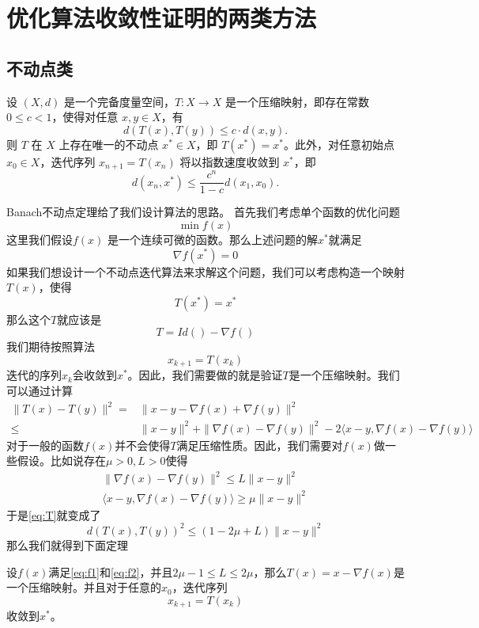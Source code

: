 \section{优化算法收敛性证明的两类方法}
\subsection{不动点类}
\begin{theorem}[Banach不动点定理] 设 $(X, d)$ 是一个完备度量空间，$T: X \to X$ 是一个压缩映射，即存在常数 $0 \leq c < 1$，使得对任意 $x, y \in X$，有
    \[
    d(T(x), T(y)) \leq c \cdot d(x, y).
    \]
    则 $T$ 在 $X$ 上存在唯一的不动点 $x^* \in X$，即 $T(x^*) = x^*$。此外，对任意初始点 $x_0 \in X$，迭代序列 $x_{n+1} = T(x_n)$ 将以指数速度收敛到 $x^*$，即
    \[
    d(x_n, x^*) \leq \frac{c^n}{1-c} d(x_1, x_0).
    \]
\end{theorem}
Banach不动点定理给了我们设计算法的思路。 首先我们考虑单个函数的优化问题
\begin{equation}\label{eq:opt_problem}
\min f(x)
\end{equation}
这里我们假设$f(x)$ 是一个连续可微的函数。那么上述问题的解$x^*$就满足
\[
\nabla f(x^*) = 0
\]
如果我们想设计一个不动点迭代算法来求解这个问题，我们可以考虑构造一个映射$T(x)$，使得
\[
T(x^*) = x^*
\]
那么这个$T$就应该是
\[
T = Id()-\nabla f()\]
我们期待按照算法$$x_{k+1} = T(x_k)$$迭代的序列$x_k$会收敛到$x^*$。因此，我们需要做的就是验证$T$是一个压缩映射。我们可以通过计算
\begin{equation}\label{eq:T}
    \begin{aligned}
     \|T(x) - T(y)\|^2 
        = &\|x - y - \nabla f(x) + \nabla f(y)\|^2 \\
        \leq& \|x - y\|^2 + \| \nabla f(x) - \nabla f(y)\|^2-2\langle x - y, \nabla f(x) - \nabla f(y)\rangle
    \end{aligned}
\end{equation}
对于一般的函数$f(x)$并不会使得$ T$满足压缩性质。因此，我们需要对$f(x)$做一些假设。比如说存在$\mu>0, L>0$使得
\begin{align}
    \| \nabla f(x) - \nabla f(y)\|^2 \leq L\|x - y\|^2\label{eq:f1}\\
    \langle x - y, \nabla f(x) - \nabla f(y)\rangle \geq \mu\|x - y\|^2\label{eq:f2}
\end{align}
于是\eqref{eq:T}就变成了
\begin{equation}
    d(T(x), T(y))^2 \leq (1 - 2\mu + L)\|x - y\|^2
\end{equation}
那么我们就得到下面定理
\begin{theorem}
设$f(x)$满足\eqref{eq:f1}和\eqref{eq:f2}，并且$2\mu-1\leq L\leq 2\mu$，那么$T(x)=x-\nabla f(x)$是一个压缩映射。并且对于任意的$x_0$，迭代序列
\[x_{k+1} = T(x_k)\]收敛到$x^*$。
\end{theorem}
